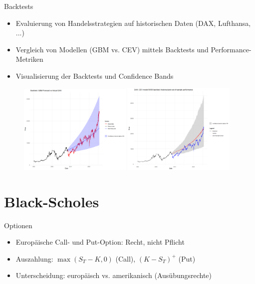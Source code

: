 \documentclass{beamer}
\begin{document}
\begin{frame}{Backtests}
  \begin{itemize}
      \item Evaluierung von Handelsstrategien auf historischen Daten (DAX, Lufthansa, ...)
      \item Vergleich von Modellen (GBM vs. CEV) mittels Backtests und Performance-Metriken
      \item Visualisierung der Backtests und Confidence Bands
  \end{itemize}
  \begin{figure}
    \centering
  \includegraphics[width=0.48\textwidth]{../thesis/images/dax_backtest.png}
  \includegraphics[width=0.48\textwidth]{../thesis/images/cev_dax_backtest.png}
  \end{figure}
\end{frame}

\section{Black-Scholes}

\begin{frame}{Optionen}
  \begin{itemize}
      \item Europäische Call- und Put-Option: Recht, nicht Pflicht
      \item Auszahlung: $\max(S_T-K,0)$ (Call), $(K-S_T)^+$ (Put)
      \item Unterscheidung: europäisch vs. amerikanisch (Ausübungsrechte)
  \end{itemize}
\end{frame}
\end{document}
